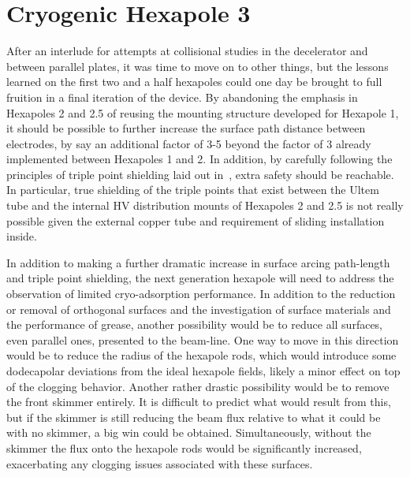 


\section{Cryogenic Hexapole 3}

After an interlude for attempts at collisional studies in the decelerator and between parallel plates, it was time to move on to other things, but the lessons learned on the first two and a half hexapoles could one day be brought to full fruition in a final iteration of the device.
By abandoning the emphasis in Hexapoles 2 and 2.5 of reusing the mounting structure developed for Hexapole 1, it should be possible to further increase the surface path distance between electrodes, by say an additional factor of 3-5 beyond the factor of 3 already implemented between Hexapoles 1 and 2.
In addition, by carefully following the principles of triple point shielding laid out in~\citep[Sec.~4.3.3]{Faircloth2013}, extra safety should be reachable.
In particular, true shielding of the triple points that exist between the Ultem tube and the internal HV distribution mounts of Hexapoles 2 and 2.5 is not really possible given the external copper tube and requirement of sliding installation inside.

In addition to making a further dramatic increase in surface arcing path-length and triple point shielding, the next generation hexapole will need to address the observation of limited cryo-adsorption performance.
In addition to the reduction or removal of orthogonal surfaces and the investigation of surface materials and the performance of grease, another possibility would be to reduce all surfaces, even parallel ones, presented to the beam-line.
One way to move in this direction would be to reduce the radius of the hexapole rods, which would introduce some dodecapolar deviations from the ideal hexapole fields, likely a minor effect on top of the clogging behavior.
Another rather drastic possibility would be to remove the front skimmer entirely.
It is difficult to predict what would result from this, but if the skimmer is still reducing the beam flux relative to what it could be with no skimmer, a big win could be obtained.
Simultaneously, without the skimmer the flux onto the hexapole rods would be significantly increased, exacerbating any clogging issues associated with these surfaces.

